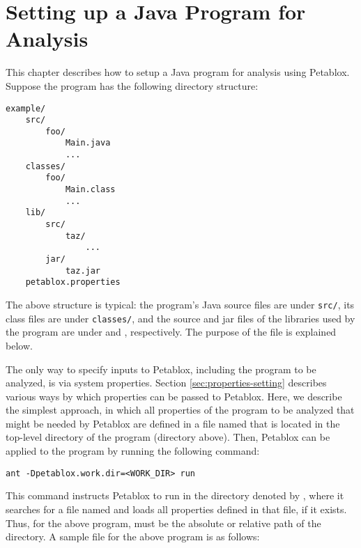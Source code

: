 \chapter{Setting up a Java Program for Analysis}
\label{chap:setup}

This chapter describes how to setup a Java program for analysis using Petablox.
Suppose the program has the following directory structure:

\begin{framed}
\begin{verbatim}
example/
    src/
        foo/
            Main.java
            ...
    classes/
        foo/
            Main.class
            ...
    lib/
        src/
            taz/
                ...
        jar/
            taz.jar
    petablox.properties
\end{verbatim}
\end{framed}

The above structure is typical: the program's Java source
files are under {\tt src/}, its class files are under {\tt classes/},
and the source and jar files of the libraries used by the program are
under  and , respectively.  The
purpose of the  file is explained below.

The only way to specify inputs to Petablox, including the program
to be analyzed, is via system properties.
Section \ref{sec:properties-setting} describes various ways by which
properties can be passed to Petablox.  Here, we describe the
simplest approach, in which all properties of the program to be analyzed
that might be needed by Petablox are defined in a file named  
that is located in the top-level directory of the program (directory  above).
Then, Petablox can be applied to the program by running the following command:

\begin{framed}
\begin{verbatim}
ant -Dpetablox.work.dir=<WORK_DIR> run
\end{verbatim}
\end{framed}

This command instructs Petablox to run in the directory denoted by , where it searches for a file
named  and
loads all properties defined in that file, if it exists.
Thus, for the above program,  must be the absolute or relative path of the
 directory.  A sample  file for the above program is as follows:


